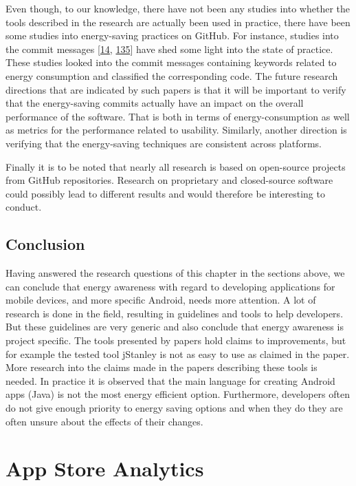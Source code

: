 \documentclass[]{book}
\begin{document}
Even though, to our knowledge, there have not been any studies into
whether the tools described in the research are actually been used in
practice, there have been some studies into energy-saving practices on
GitHub. For instance, studies into the commit messages
{[}\protect\hyperlink{ref-BLXWT2016}{14},
\protect\hyperlink{ref-MPEC2015}{135}{]} have shed some light into the
state of practice. These studies looked into the commit messages
containing keywords related to energy consumption and classified the
corresponding code. The future research directions that are indicated by
such papers is that it will be important to verify that the
energy-saving commits actually have an impact on the overall performance
of the software. That is both in terms of energy-consumption as well as
metrics for the performance related to usability. Similarly, another
direction is verifying that the energy-saving techniques are consistent
across platforms.

Finally it is to be noted that nearly all research is based on
open-source projects from GitHub repositories. Research on proprietary
and closed-source software could possibly lead to different results and
would therefore be interesting to conduct.

\section{Conclusion}\label{conclusion-2}

Having answered the research questions of this chapter in the sections
above, we can conclude that energy awareness with regard to developing
applications for mobile devices, and more specific Android, needs more
attention. A lot of research is done in the field, resulting in
guidelines and tools to help developers. But these guidelines are very
generic and also conclude that energy awareness is project specific. The
tools presented by papers hold claims to improvements, but for example
the tested tool jStanley is not as easy to use as claimed in the paper.
More research into the claims made in the papers describing these tools
is needed. In practice it is observed that the main language for
creating Android apps (Java) is not the most energy efficient option.
Furthermore, developers often do not give enough priority to energy
saving options and when they do they are often unsure about the effects
of their changes.

\chapter{App Store Analytics}\label{app-store-analytics}
\end{document}
